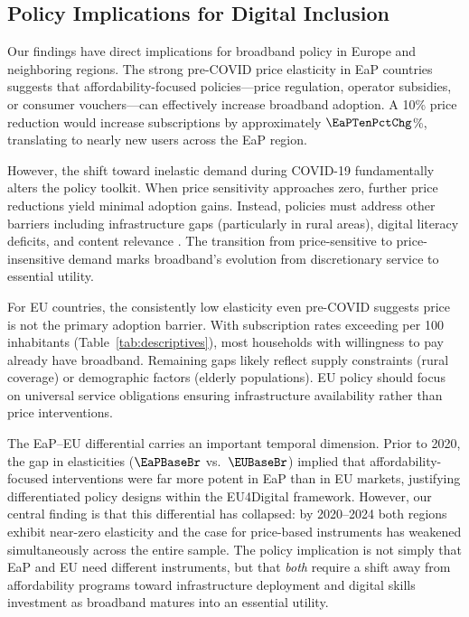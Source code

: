 \subsection{Policy Implications for Digital Inclusion}

Our findings have direct implications for broadband policy in Europe and neighboring regions. The strong pre-COVID price elasticity in EaP countries suggests that affordability-focused policies---price regulation, operator subsidies, or consumer vouchers---can effectively increase broadband adoption. A 10\% price reduction would increase subscriptions by approximately $\EaPTenPctChg$\%, translating to nearly \EaPAddSubsTotal{} new users across the EaP region.

However, the shift toward inelastic demand during COVID-19 fundamentally alters the policy toolkit. When price sensitivity approaches zero, further price reductions yield minimal adoption gains. Instead, policies must address other barriers including infrastructure gaps (particularly in rural areas), digital literacy deficits, and content relevance \citep{guermazi2021broadband}. The transition from price-sensitive to price-insensitive demand marks broadband's evolution from discretionary service to essential utility.

For EU countries, the consistently low elasticity even pre-COVID suggests price is not the primary adoption barrier. With subscription rates exceeding \DescSubsEU{} per 100 inhabitants (Table~\ref{tab:descriptives}), most households with willingness to pay already have broadband. Remaining gaps likely reflect supply constraints (rural coverage) or demographic factors (elderly populations). EU policy should focus on universal service obligations ensuring infrastructure availability rather than price interventions.

The EaP--EU differential carries an important temporal dimension. Prior to 2020, the gap in elasticities ($\EaPBaseBr$ vs.\ $\EUBaseBr$) implied that affordability-focused interventions were far more potent in EaP than in EU markets, justifying differentiated policy designs within the EU4Digital framework. However, our central finding is that this differential has collapsed: by 2020--2024 both regions exhibit near-zero elasticity and the case for price-based instruments has weakened simultaneously across the entire sample. The policy implication is not simply that EaP and EU need different instruments, but that \emph{both} require a shift away from affordability programs toward infrastructure deployment and digital skills investment as broadband matures into an essential utility.

